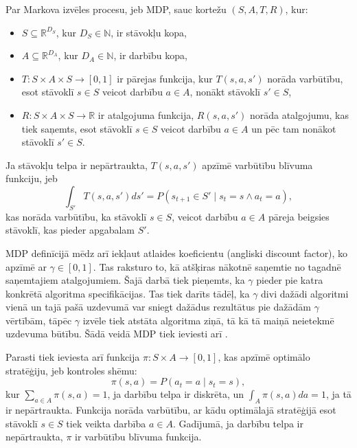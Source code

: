 \documentclass{ludis} %
\begin{document}
\begin{definicija}
Par Markova izvēles procesu, jeb MDP, sauc kortežu $(S, A, T, R)$, kur:
\begin{itemize}
	\item $S \subseteq \mathbb{R}^{D_S}$, kur $D_S \in \mathbb{N}$, ir stāvokļu kopa, %
	\item $A \subseteq \mathbb{R}^{D_A}$, kur $D_A \in \mathbb{N}$, ir darbību kopa, %
	\item $T:S \times A \times S \rightarrow [0,1]$ ir pārejas funkcija, kur $T(s, a, s')$ norāda varbūtību, esot stāvoklī $s \in S$ veicot darbību $a \in A$, nonākt stāvoklī $s' \in S$,
	\item $R:S \times A \times S \rightarrow \mathbb{R}$ ir atalgojuma funkcija, $R(s, a, s')$ norāda atalgojumu, kas tiek saņemts, esot stāvoklī $s \in S$ veicot darbību $a \in A$ un pēc tam nonākot stāvoklī $s' \in S$.
\end{itemize}
Ja stāvokļu telpa ir nepārtraukta, $T(s, a, s')$ apzīmē varbūtību blīvuma funkciju, jeb
\[
	\int_{S'} T(s, a, s')ds' = P(s_{t+1} \in S' \mid s_t = s \land a_t = a),
\]
kas norāda varbūtību, ka stāvoklī $s \in S$, veicot darbību $a \in A$ pāreja beigsies stāvoklī, kas pieder apgabalam $S'$. %
\end{definicija}

MDP definīcijā mēdz arī iekļaut atlaides koeficientu (angliski discount factor), ko apzīmē ar $\gamma \in [0,1]$.
Tas raksturo to, kā atšķiras nākotnē saņemtie no tagadnē saņemtajiem atalgojumiem.
Šajā darbā tiek pieņemts, ka $\gamma$ pieder pie katra konkrētā algoritma specifikācijas. %
Tas tiek darīts tādēļ, ka $\gamma$ divi dažādi algoritmi vienā un tajā pašā uzdevumā var sniegt dažādus rezultātus pie dažādām $\gamma$ vērtībām, %
tāpēc $\gamma$ izvēle tiek atstāta algoritma ziņā, tā kā tā maiņā neietekmē uzdevuma būtību. %
Šādā veidā MDP tiek ieviesti arī \autocite{Otterlo}.

Parasti tiek ieviesta arī funkcija $\pi: S \times A \rightarrow [0, 1]$, kas apzīmē optimālo stratēģiju, jeb kontroles shēmu:
\[
	\pi(s, a) = P(a_t = a \mid s_t = s),
\]
kur $\sum_{a\in A} \pi(s,a)=1$, ja darbību telpa ir diskrēta, un $\int_{A} \pi(s,a) da = 1$, ja tā ir nepārtraukta. Funkcija norāda varbūtību, ar kādu optimālajā stratēģijā esot stāvoklī $s \in S$ tiek veikta darbība $a \in A$. Gadījumā, ja darbību telpa ir nepārtraukta, $\pi$ ir varbūtību blīvuma funkcija.
\end{document}
